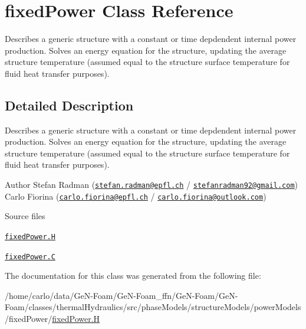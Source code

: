 \hypertarget{classFoam_1_1structures_1_1fixedPower}{}\section{fixed\+Power Class Reference}
\label{classFoam_1_1structures_1_1fixedPower}


Describes a generic structure with a constant or time depdendent internal power production. Solves an energy equation for the structure, updating the average structure temperature (assumed equal to the structure surface temperature for fluid heat transfer purposes).  




\subsection{Detailed Description}
Describes a generic structure with a constant or time depdendent internal power production. Solves an energy equation for the structure, updating the average structure temperature (assumed equal to the structure surface temperature for fluid heat transfer purposes). 

\label{_Description}%
 Author Stefan Radman (\href{mailto:stefan.radman@epfl.ch}{\tt stefan.\+radman@epfl.\+ch} / \href{mailto:stefanradman92@gmail.com}{\tt stefanradman92@gmail.\+com}) Carlo Fiorina (\href{mailto:carlo.fiorina@epfl.ch}{\tt carlo.\+fiorina@epfl.\+ch} / \href{mailto:carlo.fiorina@outlook.com}{\tt carlo.\+fiorina@outlook.\+com})

\begin{DoxyParagraph}{Source files}

\begin{DoxyItemize}
\item \href{../../../home/carlo/data/GeN-Foam/GeN-Foam_ffn/GeN-Foam/GeN-Foam/classes/thermalHydraulics/src/phaseModels/structureModels/powerModels/fixedPower/fixedPower.H}{\tt fixed\+Power.\+H} 
\item \href{../../../home/carlo/data/GeN-Foam/GeN-Foam_ffn/GeN-Foam/GeN-Foam/classes/thermalHydraulics/src/phaseModels/structureModels/powerModels/fixedPower/fixedPower.C}{\tt fixed\+Power.\+C} 
\end{DoxyItemize}
\end{DoxyParagraph}


The documentation for this class was generated from the following file\+:\begin{DoxyCompactItemize}
\item 
/home/carlo/data/\+Ge\+N-\/\+Foam/\+Ge\+N-\/\+Foam\+\_\+ffn/\+Ge\+N-\/\+Foam/\+Ge\+N-\/\+Foam/classes/thermal\+Hydraulics/src/phase\+Models/structure\+Models/power\+Models/fixed\+Power/\hyperlink{fixedPower_8H}{fixed\+Power.\+H}\end{DoxyCompactItemize}
